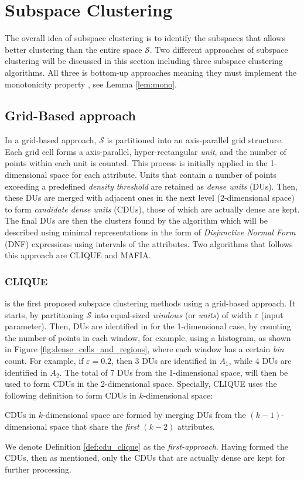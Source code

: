 \section{Subspace Clustering}
The overall idea of subspace clustering is to identify the subspaces that allows better clustering than the entire space $\mathcal{S}$. Two different approaches of subspace clustering will be discussed in this section including three subspace clustering algorithms. All three is bottom-up approaches meaning they must implement the monotonicity property \cite[p.~1:11]{kriegel-2009}, see Lemma \ref{lem:mono}.

\subsection{Grid-Based approach}
In a grid-based approach, $\mathcal{S}$ is partitioned into an axis-parallel grid structure. Each grid cell forms a axis-parallel, hyper-rectangular \textit{unit}, and the number of points within each unit is counted. This process is initially applied in the 1-dimensional space for each attribute. Units that contain a number of points exceeding a predefined \textit{density threshold} are retained as \textit{dense units} (DUs). Then, these DUs are merged with adjacent ones in the next level (2-dimensional space) to form \textit{candidate dense units} (CDUs), those of which are actually dense are kept. The final DUs are then the clusters found by the algorithm which will be described using minimal representations in the form of \textit{Disjunctive Normal Form} (DNF) expressions using intervals of the attributes. Two algorithms that follows this approach are CLIQUE and MAFIA.

\subsubsection{CLIQUE}
is the first proposed subspace clustering methods using a grid-based approach. It starts, by partitioning $\mathcal{S}$ into equal-sized \textit{windows} (or \textit{units}) of width $\varepsilon$ (input parameter). Then, DUs are identified in for the 1-dimensional case, by counting the number of points in each window, for example, using a histogram, as shown in Figure \ref{fig:dense_cells_and_regions}, where each window has a certain \textit{bin} count. For example, if $\varepsilon = 0.2$, then 3 DUs are identified in $A_1$, while 4 DUs are identified in $A_2$. The total of 7 DUs from the 1-dimensional space, will then be used to form CDUs in the 2-dimensional space. Specially, CLIQUE uses the following definition to form CDUs in $k$-dimensional space:
\begin{definition}\label{def:cdu_clique}
    CDUs in $k$-dimensional space are formed by merging DUs from the $(k-1)$-dimensional space that share the \textit{first} $(k-2)$ attributes.
\end{definition}
We denote Definition \ref{def:cdu_clique} as the \textit{first-approach}. Having formed the CDUs, then as mentioned, only the CDUs that are actually dense are kept for further processing.

